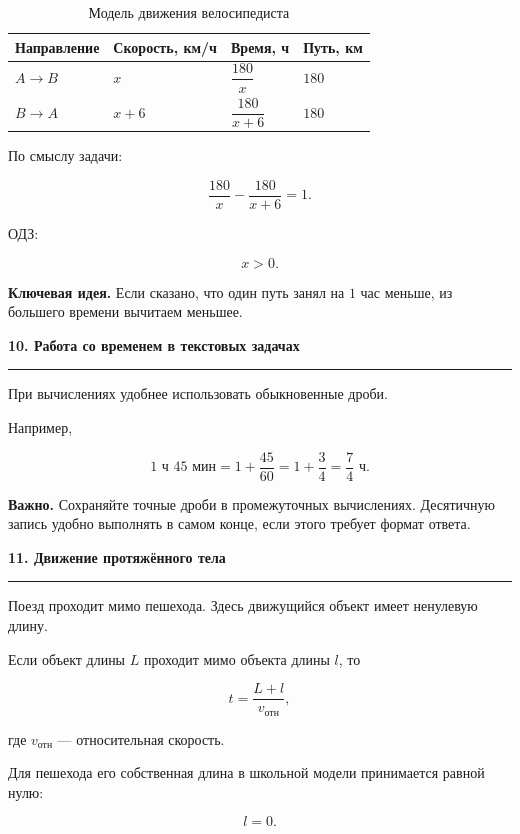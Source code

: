 \documentclass[a4paper,12pt]{article}
\newcommand{\topic}[1]{%
    \vspace{0.5em}
    {\Large\bfseries\textcolor{darkaccent}{#1}}\par
    \vspace{0.2em}
    {\color{accent}\rule{\linewidth}{0.7pt}}
    \vspace{0.5em}
}
\newcommand{\keyidea}[1]{%
    \par\smallskip
    \textbf{\textcolor{darkaccent}{Ключевая идея.}} #1
    \par\smallskip
}
\newcommand{\warning}[1]{%
    \par\smallskip
    \textbf{\textcolor{accent}{Важно.}} #1
    \par\smallskip
}
\begin{document}
\begin{table}[h]
\centering
\caption{Модель движения велосипедиста}
\renewcommand{\arraystretch}{1.4}
\begin{tabularx}{0.9\linewidth}{@{}lXXX@{}}
\toprule
Направление & Скорость, км/ч & Время, ч & Путь, км \\
\midrule
\(A\to B\) & \(x\) & \(\dfrac{180}{x}\) & \(180\) \\
\(B\to A\) & \(x+6\) & \(\dfrac{180}{x+6}\) & \(180\) \\
\bottomrule
\end{tabularx}
\end{table}

По смыслу задачи:

\[
\frac{180}{x}
-
\frac{180}{x+6}
=1.
\]

ОДЗ:

\[
x>0.
\]

\keyidea{
Если сказано, что один путь занял на \(1\) час меньше, из большего времени вычитаем меньшее.
}


\topic{10. Работа со временем в текстовых задачах}

При вычислениях удобнее использовать обыкновенные дроби.

Например,

\[
1\text{ ч }45\text{ мин}
=
1+\frac{45}{60}
=
1+\frac34
=
\frac74\text{ ч}.
\]

\warning{
Сохраняйте точные дроби в промежуточных вычислениях. Десятичную запись удобно выполнять в самом конце, если этого требует формат ответа.
}


\topic{11. Движение протяжённого тела}

Поезд проходит мимо пешехода. Здесь движущийся объект имеет ненулевую длину.

Если объект длины \(L\) проходит мимо объекта длины \(l\), то

\[
t=\frac{L+l}{v_{\text{отн}}},
\]

где \(v_{\text{отн}}\) --- относительная скорость.

Для пешехода его собственная длина в школьной модели принимается равной нулю:

\[
l=0.
\]
\end{document}
